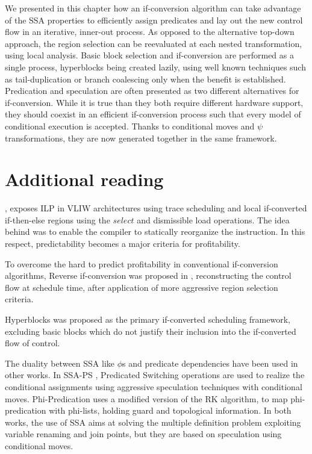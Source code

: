 We presented in this chapter how an if-conversion algorithm can take advantage of the SSA properties to efficiently assign predicates and lay out the new control flow in an iterative, inner-out process. As opposed to the alternative top-down approach, the region selection can be reevaluated at each nested transformation, using local analysis.
Basic block selection and if-conversion are performed as a single process, hyperblocks being created lazily, using well known techniques such as tail-duplication or branch coalescing only when the benefit is established.
Predication and speculation are often presented as two different alternatives for if-conversion. While it is true than they both require different hardware support, they should coexist in an efficient if-conversion process such that every model of conditional execution is accepted. Thanks to conditional moves and $\psi$ transformations, they are now generated together in the same framework.

\section{Additional reading}

\cite{Rau:2003:IP:1074100.1074489}, exposes ILP in VLIW architectures using trace scheduling and local if-converted if-then-else regions using the $select$ and dismissible load operations. The idea behind was to enable the compiler to statically reorganize the instruction. In this respect, predictability \cite{Fisher:1992:PCB:143371.143493} becomes a major criteria for profitability.

To overcome the hard to predict profitability in conventional if-conversion algorithms, Reverse if-conversion was proposed in \cite{August:1999:PRI:326224.325595}, reconstructing the control flow at schedule time, after application of more aggressive region selection criteria.

Hyperblocks \cite{Mahlke:1992:ECS:144965.144998} was proposed as the primary if-converted scheduling framework, excluding basic blocks which do not justify their inclusion into the if-converted flow of control.

The duality between SSA like $\phi$s and predicate dependencies have been used in other works. In SSA-PS \cite{Jacome01clusteredvliw}, Predicated Switching operations are used to realize the conditional assignments using aggressive speculation techniques with conditional moves. Phi-Predication \cite{Chuang03phi-predicationfor} uses a modified version of the RK algorithm, to map phi-predication with phi-lists, holding guard and topological information. In both works, the use of SSA aims at solving the multiple definition problem exploiting variable renaming and join points, but they are based on speculation using conditional moves. 

